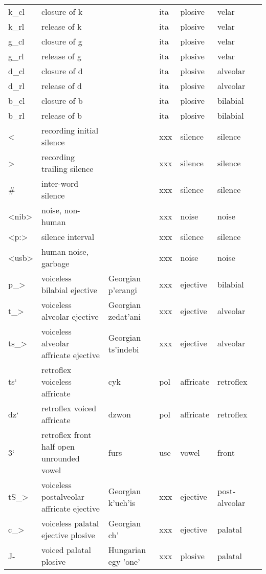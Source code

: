 \begin{longtable}{l|p{.3\linewidth}|p{.15\linewidth}|l|l|l|l}
	k\_cl	& closure of k	& 	& ita	& plosive	& velar	\\
	k\_rl	& release of k	& 	& ita	& plosive	& velar	\\
	g\_cl	& closure of g	& 	& ita	& plosive	& velar	\\
	g\_rl	& release of g	& 	& ita	& plosive	& velar	\\
	d\_cl	& closure of d	& 	& ita	& plosive	& alveolar	\\
	d\_rl	& release of d	& 	& ita	& plosive	& alveolar	\\
	b\_cl	& closure of b	& 	& ita	& plosive	& bilabial	\\
	b\_rl	& release of b	& 	& ita	& plosive	& bilabial	\\
	\textless	& recording initial silence	& 	& xxx	& silence	& silence	\\
	\textgreater	& recording trailing silence	& 	& xxx	& silence	& silence	\\
	\#	& inter-word silence	& 	& xxx	& silence	& silence	\\
	\textless nib\textgreater	& noise, non-human	& 	& xxx	& noise	& noise	\\
	\textless p:\textgreater	& silence interval	& 	& xxx	& silence	& silence	\\
	\textless usb\textgreater	& human noise, garbage	& 	& xxx	& noise	& noise	\\
	p\_\textgreater	& voiceless bilabial ejective	& Georgian p'erangi	& xxx	& ejective	& bilabial\\	
	t\_\textgreater	& voiceless alveolar ejective	& Georgian zedat'ani	& xxx	& ejective	& alveolar\\
	ts\_\textgreater	& voiceless alveolar affricate ejective	& Georgian ts'indebi	& xxx	& ejective	& alveolar	\\
	ts`	& retroflex voiceless affricate	& cyk	& pol	& affricate	& retroflex	\\
	dz`	& retroflex voiced affricate	& dzwon	& pol	& affricate	& retroflex	\\
	3`	& retroflex front half open unrounded vowel	& furs	& use	& vowel	& front	\\
	tS\_\textgreater	& voiceless postalveolar affricate ejective	& Georgian k'uch'is	& xxx	& ejective	& post-alveolar	\\
	c\_\textgreater	& voiceless palatal ejective plosive	& Georgian ch' & xxx	& ejective	& palatal	\\
	J-	& voiced palatal plosive	& Hungarian egy 'one'	& xxx	& plosive	& palatal	\\

\end{longtable}
